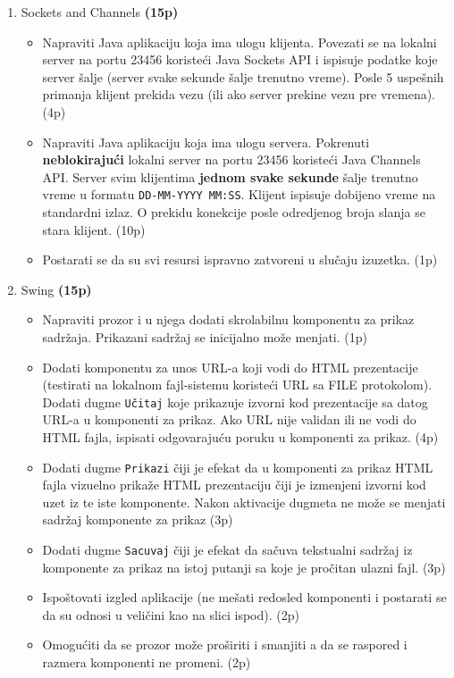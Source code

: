 \documentclass[]{article}
\begin{document}
\begin{enumerate}
  \item Sockets and Channels \textbf{(15p)}
  \begin{itemize}
    \item Napraviti Java aplikaciju koja ima ulogu klijenta. Povezati se na lokalni server na portu 23456 koriste\'c{}i Java Sockets API i ispisuje podatke koje server \v{s}alje (server svake sekunde \v{s}alje trenutno vreme). Posle 5 uspe\v{s}nih primanja klijent prekida vezu (ili ako server prekine vezu pre vremena). \hfill (4p)
    \item Napraviti Java aplikaciju koja ima ulogu servera. Pokrenuti \textbf{neblokiraju\'c{}i} lokalni server na portu 23456 koriste\'c{}i Java Channels API. Server svim klijentima \textbf{jednom svake sekunde} \v{s}alje trenutno vreme u formatu \texttt{DD-MM-YYYY MM:SS}. Klijent ispisuje dobijeno vreme na standardni izlaz. O prekidu konekcije posle odredjenog broja slanja se stara klijent. \hfill (10p)
    \item Postarati se da su svi resursi ispravno zatvoreni u slu\v{c}aju izuzetka. \hfill (1p)
  \end{itemize}

  \item Swing \textbf{(15p)}
  \begin{itemize}
    \item Napraviti prozor i u njega dodati skrolabilnu komponentu za prikaz sadr\v{z}aja. Prikazani sadr\v{z}aj se inicijalno mo\v{z}e menjati. \hfill (1p)
    \item Dodati komponentu za unos URL-a koji vodi do HTML prezentacije (testirati na lokalnom fajl-sistemu koriste\'c{}i URL sa FILE protokolom). Dodati dugme \texttt{U\v{c}itaj} koje prikazuje izvorni kod prezentacije sa datog URL-a u komponenti za prikaz. Ako URL nije validan ili ne vodi do HTML fajla, ispisati odgovaraju\'c{}u poruku u komponenti za prikaz. \hfill (4p)
    \item Dodati dugme \texttt{Prikazi} \v{c}iji je efekat da u komponenti za prikaz HTML fajla vizuelno prika\v{z}e HTML prezentaciju \v{c}iji je izmenjeni izvorni kod uzet iz te iste komponente. Nakon aktivacije dugmeta ne mo\v{z}e se menjati sadr\v{z}aj komponente za prikaz \hfill (3p)
    \item Dodati dugme \texttt{Sacuvaj} \v{c}iji je efekat da sa\v{c}uva tekstualni sadr\v{z}aj iz komponente za prikaz na istoj putanji sa koje je pro\v{c}itan ulazni fajl. \hfill (3p)
    \item Ispo\v{s}tovati izgled aplikacije (ne me\v{s}ati redosled komponenti i postarati se da su odnosi u veli\v{c}ini kao na slici ispod). \hfill (2p)
    \item Omogu\'c{}iti da se prozor mo\v{z}e pro\v{s}iriti i smanjiti a da se raspored i razmera komponenti ne promeni. \hfill (2p)
  \end{itemize}

\end{enumerate}
\end{document}
